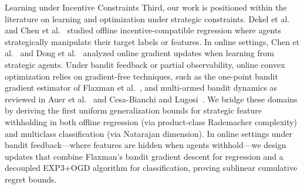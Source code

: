 \begin{sourceblock}{Learning under Incentive Constraints}
Third, our work is positioned within the literature on learning and optimization under strategic constraints. Dekel et al.~\cite{dekel2010incentive} and Chen et al.~\cite{chen2018incentive} studied offline incentive-compatible regression where agents strategically manipulate their target labels or features. In online settings, Chen et al.~\cite{chen2020learning} and Dong et al.~\cite{dong2018strategic} analyzed online gradient updates when learning from strategic agents. Under bandit feedback or partial observability, online convex optimization relies on gradient-free techniques, such as the one-point bandit gradient estimator of Flaxman et al.~\cite{flaxman2005online}, and multi-armed bandit dynamics as reviewed in Auer et al.~\cite{auer2002nonadversarial} and Cesa-Bianchi and Lugosi~\cite{cesabianchi2006prediction}. We bridge these domains by deriving the first uniform generalization bounds for strategic feature withholding in both offline regression (via product-class Rademacher complexity) and multiclass classification (via Natarajan dimension). In online settings under bandit feedback—where features are hidden when agents withhold—we design updates that combine Flaxman's bandit gradient descent for regression and a decoupled EXP3+OGD algorithm for classification, proving sublinear cumulative regret bounds.
\end{sourceblock}

\begin{faqblock}
\faqanswers
{}
\end{faqblock}
